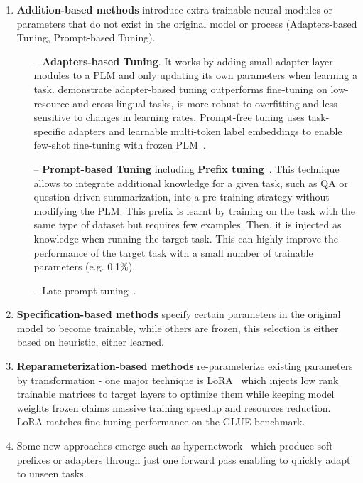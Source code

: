 \documentclass[acmsmall]{acmart}
\begin{document}
\begin{enumerate}

    \item \textbf{Addition-based methods} introduce extra trainable neural modules or parameters that do not exist in the original model or process (Adapters-based Tuning, Prompt-based Tuning).
    \begin{itemize}
        \item[--] \textbf{Adapters-based Tuning}. It works by adding small adapter layer modules to a PLM and only updating its own parameters when learning a task. \citet{heEffectivenessAdapterbasedTuning2021} demonstrate adapter-based tuning outperforms fine-tuning on low-resource and cross-lingual tasks, is more robust to overfitting and less sensitive to changes in learning rates. Prompt-free tuning uses task-specific adapters and learnable multi-token label embeddings to enable few-shot fine-tuning with frozen PLM~\citep{mahabadiPERFECTPromptfreeEfficient2022}.
        \item[--] \textbf{Prompt-based Tuning} including \textbf{Prefix tuning}~\citep{xieUnifiedSKGUnifyingMultiTasking2022, yuanFewshotQueryFocusedSummarization2022}. This technique allows to integrate additional knowledge for a given task, such as QA or question driven summarization, into a pre-training strategy without modifying the PLM. This prefix is learnt by training on the task with the same type of dataset but requires few examples. Then, it is injected as knowledge when running the target task. This can highly improve the performance of the target task with a small number of trainable parameters (e.g. 0.1\%).
        \item[--] Late prompt tuning~\citep{liuLatePromptTuning2022}.
    \end{itemize}

    \item \textbf{Specification-based methods} specify certain parameters in the original model to become trainable, while others are frozen, this selection is either based on heuristic, either learned.

    \item \textbf{Reparameterization-based methods} re-parameterize existing parameters by transformation - one major technique is LoRA~\citep{huLoRALowRankAdaptation2021} which injects low rank trainable matrices to target layers to optimize them while keeping model weights frozen claims massive training speedup and resources reduction. LoRA matches fine-tuning performance on the GLUE benchmark.

    \item Some new approaches emerge such as hypernetwork~\citep{phangHyperTuningAdaptingLarge2022} which produce soft prefixes or adapters through just one forward pass enabling to quickly adapt to unseen tasks.

\end{enumerate}
\end{document}
